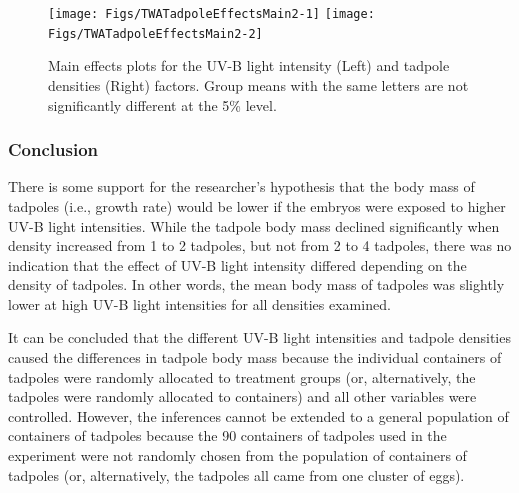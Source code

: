 \documentclass[10pt,openany]{book}\usepackage[]{graphicx}\usepackage[]{color}
\newenvironment{knitrout}{}{} %
\begin{document}
\begin{knitrout}
\color{fgcolor}\begin{figure}[hbtp]

{\centering \texttt{[image: Figs/TWATadpoleEffectsMain2-1]} 
\texttt{[image: Figs/TWATadpoleEffectsMain2-2]} 

}

\caption[Main effects plots for the UV-B light intensity (Left) and tadpole densities (Right) factors]{Main effects plots for the UV-B light intensity (Left) and tadpole densities (Right) factors.  Group means with the same letters are not significantly different at the 5\% level.}\label{fig:TWATadpoleEffectsMain2}
\end{figure}


\end{knitrout}

\subsubsection*{Conclusion}
There is some support for the researcher's hypothesis that the body mass of tadpoles (i.e., growth rate) would be lower if the embryos were exposed to higher UV-B light intensities.  While the tadpole body mass declined significantly when density increased from 1 to 2 tadpoles, but not from 2 to 4 tadpoles, there was no indication that the effect of UV-B light intensity differed depending on the density of tadpoles.  In other words, the mean body mass of tadpoles was slightly lower at high UV-B light intensities for all densities examined.

It can be concluded that the different UV-B light intensities and tadpole densities caused the differences in tadpole body mass because the individual containers of tadpoles were randomly allocated to treatment groups (or, alternatively, the tadpoles were randomly allocated to containers) and all other variables were controlled.  However, the inferences cannot be extended to a general population of containers of tadpoles because the 90 containers of tadpoles used in the experiment were not randomly chosen from the population of containers of tadpoles (or, alternatively, the tadpoles all came from one cluster of eggs).
\end{document}
